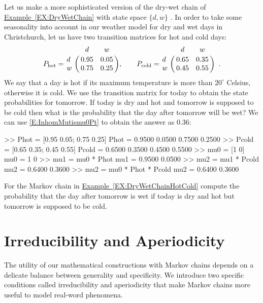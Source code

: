 \begin{example}\label{EX:DryWetChainHotCold}
Let us make a more sophisticated version of the dry-wet chain of \hyperref[EX:DryWetChain]{Example~\ref*{EX:DryWetChain}} with state space $\{d,w\}$ .  In order to take some seasonality into account in our weather model for dry and wet days in Christchurch, let us have two transition matrices for hot and cold days:
\[
P_{\text{hot}} = 
\bordermatrix{~ & d & w \cr
d & 0.95 & 0.05 \cr
w & 0.75 & 0.25},
\qquad
P_{\text{cold}} = 
\bordermatrix{~ & d & w \cr
d & 0.65 & 0.35 \cr
w & 0.45 & 0.55} \enspace .
\]
We say that a day is hot if its  maximum temperature is more than $20^{\circ}$ Celsius, otherwise it is cold.  We use the transition matrix for today to obtain the state probabilities for tomorrow.  If today is dry and hot and tomorrow is supposed to be cold then what is the probability that the day after tomorrow will be wet?  We can use \eqref{E:InhomMutismu0Pt} to obtain the answer as $0.36$: 
\begin{VrbM}
>> Phot = [0.95 0.05; 0.75 0.25] %
Phot =
    0.9500    0.0500
    0.7500    0.2500
>> Pcold = [0.65 0.35; 0.45 0.55] %
Pcold =
    0.6500    0.3500
    0.4500    0.5500
>> mu0 = [1 0] %
mu0 =     1     0
>> mu1 = mu0 * Phot %
mu1 =    0.9500    0.0500
>> mu2 = mu1 * Pcold %
mu2 =    0.6400    0.3600
>> mu2 = mu0 * Phot * Pcold %
mu2 =    0.6400    0.3600
\end{VrbM}
\end{example}

\begin{exercise}\label{Exr:DryWetChainHotCold}
For the Markov chain in \hyperref[EX:DryWetChainHotCold]{Example~\ref*{EX:DryWetChainHotCold}}  compute the probability that the day after tomorrow is wet if today is dry and hot but tomorrow is supposed to be cold.
\end{exercise}

\section{Irreducibility and Aperiodicity}\label{S:IrredAperiod}
The utility of our mathematical constructions with Markov chains depends on a delicate balance between generality and specificity.  We introduce two specific conditions called irreducibility and aperiodicity that make Markov chains more useful to model real-word phenomena.


